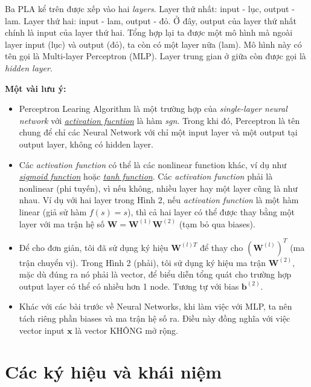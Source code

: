 Ba PLA kể trên được xếp vào hai \textit{layers}. Layer thứ nhất: input - lục, output - lam. Layer thứ hai: input - lam, output - đỏ. Ở đây, output của layer thứ nhất chính là input của layer thứ hai. Tổng hợp lại ta được một mô hình mà ngoài layer input (lục) và output (đỏ), ta còn có một layer nữa (lam). Mô hình này có tên gọi là Multi-layer Perceptron (MLP). Layer trung gian ở giữa còn được gọi là \textit{hidden layer}. 
 
 
\textbf{Một vài lưu ý:} 
\begin{itemize}
    \item Perceptron Learing Algorithm là một trường hợp của \textit{single-layer neural network} với \href{http://machinelearningcoban.com/2017/01/27/logisticregression/#nhac-lai-hai-mo-hinh-tuyen-tinh}{\textit{activation fucntion}} là hàm \textit{sgn}. Trong khi đó, Perceptron là tên chung để chỉ các Neural Network với chỉ một input layer và một output tại output layer, không có hidden layer. 
     
    \item Các \textit{activation function} có thể là các nonlinear function khác, ví dụ như \href{http://machinelearningcoban.com/2017/01/27/logisticregression/#sigmoid-function}{\textit{sigmoid function}} hoặc \href{http://machinelearningcoban.com/2017/01/27/logisticregression/#tanh-function}{\textit{tanh function}}. Các \textit{activation function} phải là nonlinear (phi tuyến), vì nếu không, nhiều layer hay một layer cũng là như nhau. Ví dụ với hai layer trong Hình 2, nếu \textit{activation function} là một hàm linear (giả sử hàm $f(s) = s$), thì cả hai layer có thể được thay bằng một layer với ma trận hệ số $\mathbf{W} = \mathbf{W}^{(1)}\mathbf{W}^{(2)}$ (tạm bỏ qua biases). 
     
    \item Để cho đơn giản, tôi đã sử dụng ký hiệu $\mathbf{W}^{(l)T}$ để thay cho $(\mathbf{W}^{(l)})^T$ (ma trận chuyển vị). Trong Hình 2 (phải), tôi sử dụng ký hiệu ma trận $\mathbf{W}^{(2)}$, mặc dù đúng ra nó phải là vector, để biểu diễn tổng quát cho trường hợp output layer có thể có nhiều hơn 1 node. Tương tự với bias $\mathbf{b}^{(2)}$. 
     
    \item Khác với các bài trước về Neural Networks, khi làm việc với MLP, ta nên tách riêng phần biases và ma trận hệ số ra. Điều này đồng nghĩa với việc vector input $\mathbf{x}$ là vector KHÔNG mở rộng. 
\end{itemize}
 
 
\section{Các ký hiệu và khái niệm}
 
